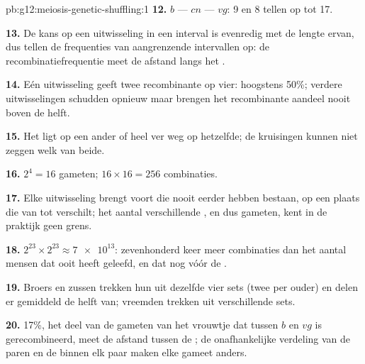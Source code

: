 \begin{solution}{pb:g12:meiosis-genetic-shuffling:1}
\textbf{12.} $b$ --- $cn$ --- $vg$: 9 en 8 tellen op tot 17.

\textbf{13.} De kans op een uitwisseling in een interval is evenredig met
de lengte ervan, dus tellen de frequenties van aangrenzende intervallen
op: de recombinatiefrequentie meet de afstand langs het .

\textbf{14.} Eén uitwisseling geeft twee recombinante  op vier:
hoogstens 50\%; verdere uitwisselingen schudden opnieuw maar brengen het
recombinante aandeel nooit boven de helft.

\textbf{15.} Het ligt op een ander  of heel ver weg op hetzelfde;
de kruisingen kunnen niet zeggen welk van beide.

\textbf{16.} $2^4 = 16$ gameten; $16 \times 16 = 256$ combinaties.

\textbf{17.} Elke uitwisseling brengt  voort die nooit eerder
hebben bestaan, op een plaats die van  tot  verschilt; het
aantal verschillende , en dus gameten, kent in de praktijk geen
grens.

\textbf{18.} $2^{23} \times 2^{23} \approx \num{7e13}$: zevenhonderd keer
meer combinaties dan het aantal mensen dat ooit heeft geleefd, en dat nog
vóór de .

\textbf{19.} Broers en zussen trekken hun  uit dezelfde vier sets
(twee per ouder) en delen er gemiddeld de helft van; vreemden trekken uit
verschillende sets.

\textbf{20.} 17\%, het deel van de gameten van het vrouwtje dat tussen $b$
en $vg$ is gerecombineerd, meet de afstand tussen de ; de
onafhankelijke verdeling van de paren en de  binnen elk paar
maken elke gameet anders.
\end{solution}
